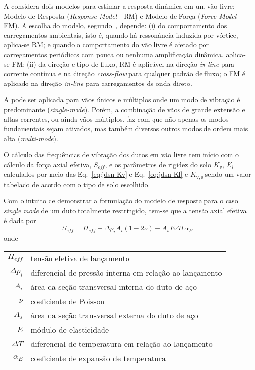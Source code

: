 A  considera dois modelos para estimar a resposta dinâmica em um vão livre: Modelo de Resposta (\textit{Response Model} - RM) e Modelo de Força (\textit{Force Model} - FM). 
A escolha do modelo, segundo~\citet{Tura1994}, depende:
(i) do comportamento dos carregamentos ambientais, isto é, quando há ressonância induzida por vórtice, aplica-se RM; e quando o comportamento do vão livre é afetado por carregamentos periódicos com pouca ou nenhuma amplificação dinâmica, aplica-se FM;
(ii) da direção e tipo de fluxo, RM é aplicável na direção \textit{in-line} para corrente contínua e na direção \textit{cross-flow} para qualquer padrão de fluxo; o FM é aplicado na direção \textit{in-line} para carregamentos de onda direto.

A  pode ser aplicada para vãos únicos e múltiplos onde um modo de vibração é predominante (\textit{single-mode}).
Porém, a combinação de vãos de grande extensão e altas correntes, ou ainda vãos múltiplos, faz com que não apenas os modos fundamentais sejam ativados, mas também diversos outros modos de ordem mais alta (\textit{multi-mode}).

O cálculo das frequências de vibração dos dutos em vão livre tem início com o cálculo da força axial efetiva, $S_\mathit{eff}$, e os parâmetros de rigidez do solo $K_v$, $K_l$ calculados por meio das Eq.~\eqref{eq:jdsn-Kv} e Eq.~\eqref{eq:jdsn-Kl} e $K_\mathrm{v,s}$ sendo um valor tabelado de acordo com o tipo de solo escolhido. 

Com o intuito de demonstrar a formulação do modelo de resposta para o caso \textit{single mode} de um duto totalmente restringido, tem-se que a tensão axial efetiva é dada por
\begin{equation}
\label{eq:jdsn-Seff} 
S_\mathit{eff} = H_\mathit{eff} - \Delta p_i A_i (1 - 2\nu) - A_s E \Delta T \alpha_E
\end{equation}
onde

\begin{tabular}{rl}
$H_\mathit{eff}$ & tensão efetiva de lançamento\\
$\Delta p_i$     & diferencial de pressão interna em relação ao lançamento\\
$A_i$            & área da seção transversal interna do duto de aço\\
$\nu$            & coeficiente de Poisson\\
$A_s$            & área da seção transversal externa do duto de aço\\
$E$              & módulo de elasticidade\\
$\Delta T$       & diferencial de temperatura em relação ao lançamento\\
$\alpha_E$       & coeficiente de expansão de temperatura
\end{tabular}

